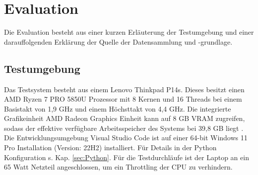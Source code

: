 \chapter{Evaluation}
\label{ch:Evaluation} 
Die Evaluation besteht aus einer kurzen Erläuterung der Testumgebung und einer darauffolgenden Erklärung der Quelle der Datensammlung und -grundlage. 
\section{Testumgebung}{ \label{sec:testumgebung}
Das Testsystem besteht aus einem Lenovo Thinkpad P14s. Dieses besitzt einen AMD Ryzen 7 PRO 5850U Prozessor mit 8 Kernen und 16 Threads bei einem Basistakt von 1,9 GHz und einem Höchsttakt von 4,4 GHz. Die integrierte Grafikeinheit AMD Radeon Graphics Einheit kann auf 8 GB VRAM zugreifen, sodass der effektive verfügbare Arbeitsspeicher des Systems bei 39,8 GB liegt \citep{PSREF21}. Die Entwicklungsumgebung \glqq Visual Studio Code\grqq{} ist auf einer 64-bit Windows 11 Pro Installation (Version: 22H2) installiert. Für Details in der Python Konfiguration s. Kap. \ref{sec:Python}. Für die Testdurchläufe ist der Laptop an ein 65 Watt Netzteil angeschlossen, um ein Throttling der CPU zu verhindern. \\ }


